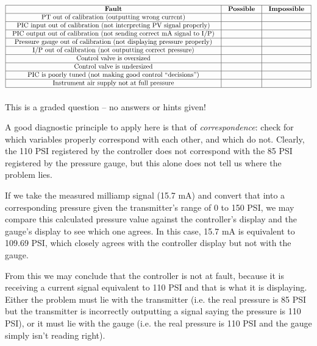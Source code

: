 $$\vbox{\offinterlineskip
\halign{\strut
\vrule \quad\hfil # \ \hfil & 
\vrule \quad\hfil # \ \hfil & 
\vrule \quad\hfil # \ \hfil \vrule \cr
\noalign{\hrule}
%
{\bf Fault} & {\bf Possible} & {\bf Impossible} \cr
%
\noalign{\hrule}
%
PT out of calibration (outputting wrong current) &  &  \cr
%
\noalign{\hrule}
%
PIC input out of calibration (not interpreting PV signal properly) &  &  \cr
%
\noalign{\hrule}
%
PIC output out of calibration (not sending correct mA signal to I/P) &  &  \cr
%
\noalign{\hrule}
%
Pressure gauge out of calibration (not displaying pressure properly) &  &  \cr
%
\noalign{\hrule}
%
I/P out of calibration (not outputting correct pressure) &  &  \cr
%
\noalign{\hrule}
%
Control valve is oversized &  &  \cr
%
\noalign{\hrule}
%
Control valve is undersized &  &  \cr
%
\noalign{\hrule}
%
PIC is poorly tuned (not making good control ``decisions'') &  &  \cr
%
\noalign{\hrule}
%
Instrument air supply not at full pressure &  &  \cr
%
\noalign{\hrule}
} %
}$$ %







This is a graded question -- no answers or hints given!







A good diagnostic principle to apply here is that of {\it correspondence}: check for which variables properly correspond with each other, and which do not.  Clearly, the 110 PSI registered by the controller does not correspond with the 85 PSI registered by the pressure gauge, but this alone does not tell us where the problem lies.

If we take the measured milliamp signal (15.7 mA) and convert that into a corresponding pressure given the transmitter's range of 0 to 150 PSI, we may compare this calculated pressure value against the controller's display and the gauge's display to see which one agrees.  In this case, 15.7 mA is equivalent to 109.69 PSI, which closely agrees with the controller display but not with the gauge.

From this we may conclude that the controller is not at fault, because it is receiving a current signal equivalent to 110 PSI and that is what it is displaying.  Either the problem must lie with the transmitter (i.e. the real pressure is 85 PSI but the transmitter is incorrectly outputting a signal saying the pressure is 110 PSI), or it must lie with the gauge (i.e. the real pressure is 110 PSI and the gauge simply isn't reading right).

